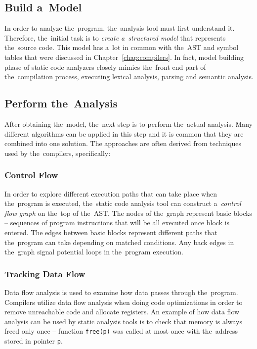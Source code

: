 \documentclass[
  digital, %
  table,   %
  lof,     %
  lot,     %
  oneside,
]{fithesis3}
\begin{document}
\subsection{Build a~Model}
In order to analyze the~program, the~analysis tool must first understand it. Therefore, the~initial task is to \textit{create a~structured model} that represents the~source code. This model has a~lot in common with the~AST and symbol tables that were discussed in Chapter~\ref{chap:compilers}. In fact, model building phase of static code analyzers closely mimics the~front end part of the~compilation process, executing lexical analysis, parsing and semantic analysis.

\subsection{Perform the~Analysis}
After obtaining the~model, the~next step is to perform the~actual analysis. Many different algorithms can be applied in this step and it is common that they are combined into one solution. The approaches are often derived from techniques used by the~compilers, specifically:

\subsubsection{Control Flow}
In order to explore different execution paths that can take place when the~program is executed, the~static code analysis tool can construct a~\textit{control flow graph} on the~top of the~AST. The nodes of the~graph represent basic blocks -- sequences of program instructions that will be all executed once block is entered. The edges between basic blocks represent different paths that the~program can take depending on matched conditions. Any back edges in the~graph signal potential loops in the~program execution.

\subsubsection{Tracking Data Flow}
Data flow analysis is used to examine how data passes through the~program. Compilers utilize data flow analysis when doing code optimizations in order to remove unreachable code and allocate registers. An example of how data flow analysis can be used by static analysis tools is to check that memory is always freed only once -- function \texttt{free(p)} was called at most once with the~address stored in pointer \texttt{p}.
\end{document}
